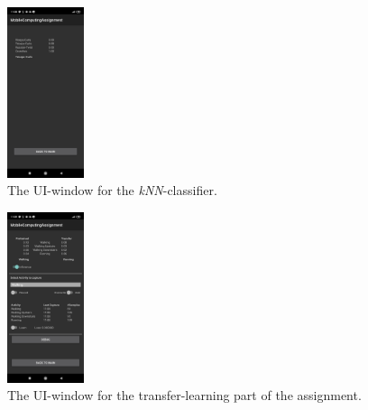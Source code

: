\documentclass[journal]{IEEEtran}
\begin{document}
\begin{figure}[htbp]
    \centering
    \includegraphics[width=0.2\textwidth]{figures/UI_kNN.jpg}
    \caption{The UI-window for the \textit{kNN}-classifier.}
    \label{fig:UI_kNN}
\end{figure}

\begin{figure}[htbp]
    \centering
    \includegraphics[width=0.2\textwidth]{figures/UI_TFL.jpg}
    \caption{The UI-window for the transfer-learning part of the assignment.}
    \label{fig:UI_TFL}
\end{figure}
\end{document}

